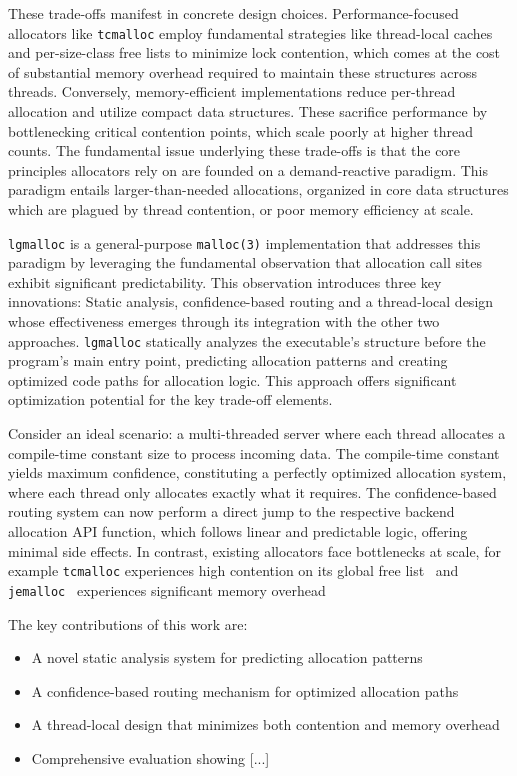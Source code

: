 \documentclass[sigconf,authordraft]{acmart}
\begin{document}
These trade-offs manifest in concrete design choices. Performance-focused allocators
like \texttt{tcmalloc} employ fundamental strategies like thread-local caches
and per-size-class free lists to minimize lock contention, which comes at the cost of
substantial memory overhead required to maintain these structures across threads.
Conversely, memory-efficient implementations reduce per-thread allocation and
utilize compact data structures. These sacrifice performance by bottlenecking
critical contention points, which scale poorly at higher thread counts.
The fundamental issue underlying these trade-offs is that the core principles
allocators rely on are founded on a demand-reactive paradigm. This paradigm
entails larger-than-needed allocations, organized in core data structures which
are plagued by thread contention, or poor memory efficiency at scale.

\texttt{lgmalloc} is a general-purpose \texttt{malloc(3)} implementation that
addresses this paradigm by leveraging the fundamental observation
that allocation call sites exhibit significant predictability. This observation
introduces three key innovations: Static analysis, confidence-based routing and
a thread-local design whose effectiveness emerges through its integration with
the other two approaches. \texttt{lgmalloc} statically analyzes the executable's
structure before the program's main entry point, predicting allocation patterns
and creating optimized code paths for allocation logic. This approach offers
significant optimization potential for the key trade-off elements.

Consider an ideal scenario: a multi-threaded server where each thread allocates
a compile-time constant size to process incoming data. The compile-time constant
yields maximum confidence, constituting a perfectly optimized allocation system, 
where each thread only allocates exactly what it requires. The confidence-based
routing system can now perform a direct jump to the respective backend allocation
API function, which follows linear and predictable logic, offering minimal side effects.
In contrast, existing allocators face bottlenecks at scale, for example \texttt{tcmalloc}
experiences high contention on its global free list~\cite{Lee:2014:TCMallocPerformance}
and \texttt{jemalloc}~\cite{jemalloc2006} experiences significant memory overhead~\cite{Matias:2011:ComparativeStudy}

The key contributions of this work are:
\begin{itemize}[nosep]
  \item A novel static analysis system for predicting allocation patterns
  \item A confidence-based routing mechanism for optimized allocation paths
  \item A thread-local design that minimizes both contention and memory overhead
  \item Comprehensive evaluation showing [...] %
\end{itemize}
\end{document}
